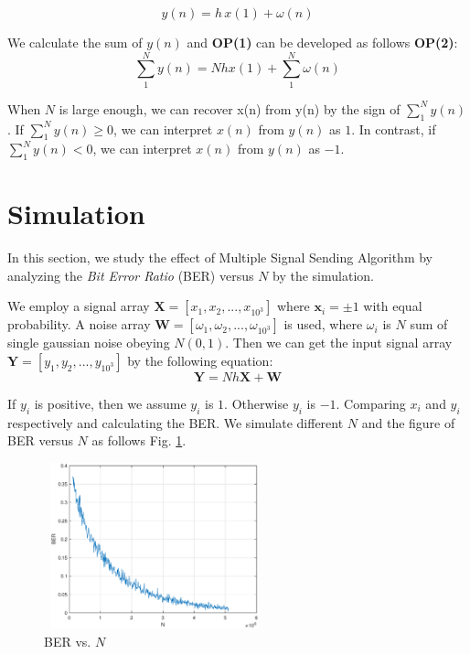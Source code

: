 \documentclass[conference]{IEEEtran}
\begin{document}
\begin{equation}
y(n) = h\,x(1)+\omega(n)
\end{equation}

We calculate the sum of $y(n)$ and \textbf{OP(1)} can be developed as follows \textbf{OP(2)}:
\begin{equation}
\sum^N_1 y(n) = Nhx(1)+\sum^N_1 \omega(n)
\end{equation}

When $N$ is large enough, we can recover x(n) from y(n) by the sign of $\sum^N_1y(n)$. If $\sum^N_1y(n) \ge 0$, we can interpret $x(n)$ from $y(n)$ as $1$. In contrast, if $\sum^N_1y(n) < 0$, we can interpret $x(n)$ from $y(n)$ as $-1$.


\section{Simulation}
In this section, we study the effect of Multiple Signal Sending Algorithm by analyzing the \emph{Bit Error Ratio} (BER) versus $N$ by the simulation.

We employ a signal array $\textbf{X}=[x_1,x_2,...,x_{10^3}]$ where $\textbf{x}_i=\pm 1$ with equal probability. A noise array $\textbf{W}=[\omega_1,\omega_2,...,\omega_{10^3}]$ is used, where $\omega_i$ is $N$ sum of single gaussian noise obeying $N(0,1)$. Then we can get the input signal array $\textbf{Y}=[y_1,y_2,...,y_{10^3}]$ by the following equation:
\begin{equation*}
\textbf{Y}=Nh\textbf{X}+\textbf{W}
\end{equation*}

If $y_i$ is positive, then we assume $y_i$ is $1$. Otherwise $y_i$ is $-1$. Comparing $x_i$ and $y_i$ respectively and calculating the BER. We simulate different $N$ and the figure of BER versus $N$ as follows Fig. \ref{fig}.
\begin{figure}[htbp]
\centering
\vspace{-4mm}
\includegraphics[height=48mm,width=64mm]{BERvsN.eps}
\vspace{-4mm}
\caption{BER vs. $N$}
\centering
\label{fig}
\vspace{-4mm}
\end{figure}
\end{document}
